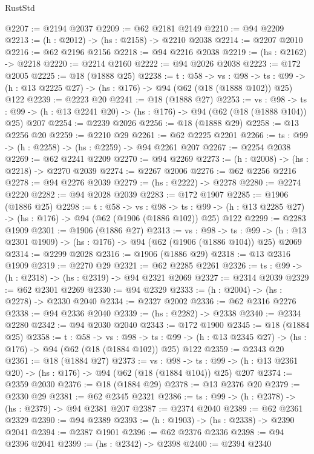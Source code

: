 \begin{lexlean}{RustStd}
\begin{coremodule}
{\begin{coremodule}
{{{{{{{{{@2207 := @2194 @2037
@2209 := @62 @2181 @2149
@2210 := @94 @2209
@2213 := (h : @2012) -> (hs : @2158) -> @2210 @2038
@2214 := @2207 @2010
@2216 := @62 @2196 @2156
@2218 := @94 @2216 @2038
@2219 := (hs : @2162) -> @2218
@2220 := @2214 @2160
@2222 := @94 @2026 @2038
@2223 := @172 @2005
@2225 := @18 (@1888 @25)
@2238 := {t : @58} ->
  {vs : @98} ->
  {ts : @99} -> (h : @13 @2225 @27) -> (hs : @176) -> @94 (@62 (@18 (@1888 @102)) @25) @122
@2239 := @2223 @20
@2241 := @18 (@1888 @27)
@2253 := {vs : @98} ->
  {ts : @99} -> (h : @13 @2241 @20) -> (hs : @176) -> @94 (@62 (@18 (@1888 @104)) @25) @207
@2254 := @2239 @2026
@2256 := @18 (@1888 @29)
@2258 := @13 @2256 @20
@2259 := @2210 @29
@2261 := @62 @2225 @2201
@2266 := {ts : @99} -> (h : @2258) -> (hs : @2259) -> @94 @2261 @207
@2267 := @2254 @2038
@2269 := @62 @2241 @2209
@2270 := @94 @2269
@2273 := (h : @2008) -> (hs : @2218) -> @2270 @2039
@2274 := @2267 @2006
@2276 := @62 @2256 @2216
@2278 := @94 @2276 @2039
@2279 := (hs : @2222) -> @2278
@2280 := @2274 @2220
@2282 := @94 @2028 @2039
@2283 := @172 @1907
@2285 := @1906 (@1886 @25)
@2298 := {t : @58} ->
  {vs : @98} ->
  {ts : @99} -> (h : @13 @2285 @27) -> (hs : @176) -> @94 (@62 (@1906 (@1886 @102)) @25) @122
@2299 := @2283 @1909
@2301 := @1906 (@1886 @27)
@2313 := {vs : @98} ->
  {ts : @99} -> (h : @13 @2301 @1909) -> (hs : @176) -> @94 (@62 (@1906 (@1886 @104)) @25) @2069
@2314 := @2299 @2028
@2316 := @1906 (@1886 @29)
@2318 := @13 @2316 @1909
@2319 := @2270 @29
@2321 := @62 @2285 @2261
@2326 := {ts : @99} -> (h : @2318) -> (hs : @2319) -> @94 @2321 @2069
@2327 := @2314 @2039
@2329 := @62 @2301 @2269
@2330 := @94 @2329
@2333 := (h : @2004) -> (hs : @2278) -> @2330 @2040
@2334 := @2327 @2002
@2336 := @62 @2316 @2276
@2338 := @94 @2336 @2040
@2339 := (hs : @2282) -> @2338
@2340 := @2334 @2280
@2342 := @94 @2030 @2040
@2343 := @172 @1900
@2345 := @18 (@1884 @25)
@2358 := {t : @58} ->
  {vs : @98} ->
  {ts : @99} -> (h : @13 @2345 @27) -> (hs : @176) -> @94 (@62 (@18 (@1884 @102)) @25) @122
@2359 := @2343 @20
@2361 := @18 (@1884 @27)
@2373 := {vs : @98} ->
  {ts : @99} -> (h : @13 @2361 @20) -> (hs : @176) -> @94 (@62 (@18 (@1884 @104)) @25) @207
@2374 := @2359 @2030
@2376 := @18 (@1884 @29)
@2378 := @13 @2376 @20
@2379 := @2330 @29
@2381 := @62 @2345 @2321
@2386 := {ts : @99} -> (h : @2378) -> (hs : @2379) -> @94 @2381 @207
@2387 := @2374 @2040
@2389 := @62 @2361 @2329
@2390 := @94 @2389
@2393 := (h : @1903) -> (hs : @2338) -> @2390 @2041
@2394 := @2387 @1901
@2396 := @62 @2376 @2336
@2398 := @94 @2396 @2041
@2399 := (hs : @2342) -> @2398
@2400 := @2394 @2340
}}}}}}}}}
\end{coremodule}}
\end{coremodule}
\end{lexlean}
